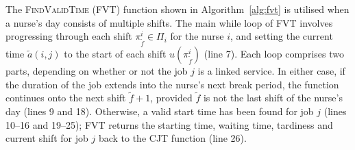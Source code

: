 \documentclass[a4paper,11pt,authoryear]{elsarticle}
\begin{document}

The \textsc{FindValidTime} (FVT) function shown in Algorithm~\ref{alg:fvt} is utilised when a nurse's day consists of multiple shifts. The main while loop of FVT involves progressing through each shift $\pi_{\tilde{f}}^i \in \Pi_i$ for the nurse $i$, and setting the current time $\tilde{a}(i,j)$ to the start of each shift $u(\pi_{\tilde{f}}^i)$ (line 7). Each loop comprises two parts, depending on whether or not the job $j$ is a linked service. In either case, if the duration of the job extends into the nurse's next break period, the function continues onto the next shift $\tilde{f}+1$, provided $\tilde{f}$ is not the last shift of the nurse's day (lines 9 and 18). Otherwise, a valid start time has been found for job $j$ (lines 10--16 and 19--25); FVT returns the starting time, waiting time, tardiness and current shift for job $j$ back to the CJT function (line 26).
\end{document}
